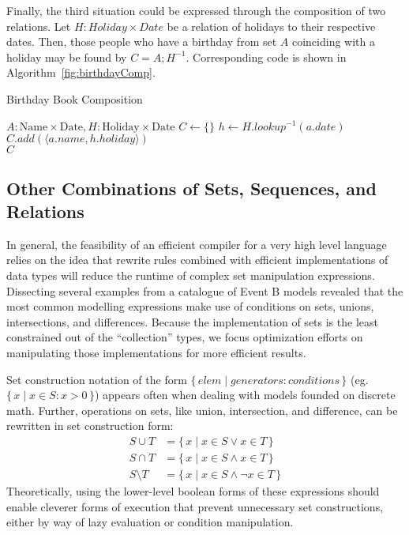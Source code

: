 \documentclass{article}
\newcommand{\Set}[2]{%
  \{\, #1 \mid #2 \, \}%
}
\begin{document}
Finally, the third situation could be expressed through the composition of two relations. Let $H: Holiday \times Date$ be a relation of holidays to their respective dates. Then, those people who have a birthday from set $A$ coinciding with a holiday may be found by $C = A\mathbin{;}H^{-1}$. Corresponding code is shown in Algorithm~\ref{fig:birthdayComp}.

\begin{algorithm}
  \caption{Birthday Book Composition}
  \begin{algorithmic}
    \Require $A: \text{Name} \times \text{Date}, H: \text{Holiday} \times \text{Date}$
    \State $C \gets \{\}$
      \State $h \gets H.lookup^{-1}(a.date)$
        \State $C.add(\langle a.name, h.holiday \rangle)$
      \EndIf
    \EndFor\\
    \Return $C$
  \end{algorithmic}
  \label{fig:birthdayComp}
\end{algorithm}

\subsection{Other Combinations of Sets, Sequences, and Relations}

In general, the feasibility of an efficient compiler for a very high level language relies on the idea that rewrite rules combined with efficient implementations of data types will reduce the runtime of complex set manipulation expressions. Dissecting several examples from a catalogue of Event B models revealed that the most common modelling expressions make use of conditions on sets, unions, intersections, and differences. Because the implementation of sets is the least constrained out of the ``collection'' types, we focus optimization efforts on manipulating those implementations for more efficient results.

Set construction notation of the form $\Set{elem}{generators: conditions}$ (eg. $\Set{x}{x \in S : x > 0}$) appears often when dealing with models founded on discrete math. Further, operations on sets, like union, intersection, and difference, can be rewritten in set construction form:
\begin{align*}
  S \cup T &= \Set{x}{x \in S \lor x \in T}\\
  S \cap T &= \Set{x}{x \in S \land x \in T}\\
  S \setminus T &= \Set{x}{x \in S \land \lnot x \in T}
\end{align*}
Theoretically, using the lower-level boolean forms of these expressions should enable cleverer forms of execution that prevent unnecessary set constructions, either by way of lazy evaluation or condition manipulation.
\end{document}
